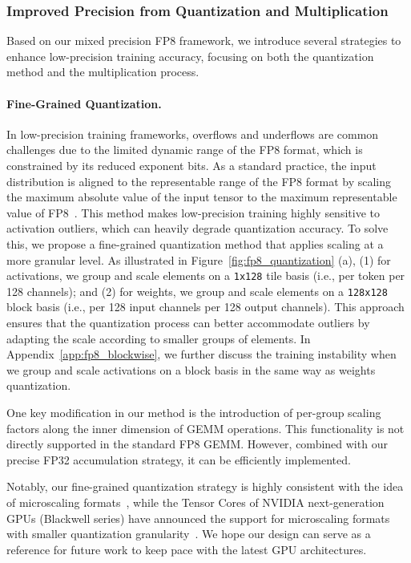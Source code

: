 \subsubsection{Improved Precision from Quantization and Multiplication}
Based on our mixed precision FP8 framework, we introduce several strategies to enhance low-precision training accuracy, focusing on both the quantization method and the multiplication process.

\paragraph{Fine-Grained Quantization.}
In low-precision training frameworks, overflows and underflows are common challenges due to the limited dynamic range of the FP8 format, which is constrained by its reduced exponent bits. 
As a standard practice, the input distribution is aligned to the representable range of the FP8 format by scaling the maximum absolute value of the input tensor to the maximum representable value of FP8~\citep{fp16train}. 
This method makes low-precision training highly sensitive to activation outliers, which can heavily degrade quantization accuracy.
To solve this, we propose a fine-grained quantization method that applies scaling at a more granular level. 
As illustrated in Figure~\ref{fig:fp8_quantization} (a), (1) for activations, we group and scale elements on a \texttt{1x128} tile basis (i.e., per token per 128 channels); and (2) for weights, we group and scale elements on a \texttt{128x128} block basis (i.e., per 128 input channels per 128 output channels).
This approach ensures that the quantization process can better accommodate outliers by adapting the scale according to smaller groups of elements. 
In Appendix~\ref{app:fp8_blockwise}, we further discuss the training instability when we group and scale activations on a block basis in the same way as weights quantization.

One key modification in our method is the introduction of per-group scaling factors along the inner dimension of GEMM operations. 
This functionality is not directly supported in the standard FP8 GEMM. 
However, combined with our precise FP32 accumulation strategy, it can be efficiently implemented. 

Notably, our fine-grained quantization strategy is highly consistent with the idea of microscaling formats~\citep{rouhani2023microscaling}, while the Tensor Cores of NVIDIA next-generation GPUs (Blackwell series) have announced the support for microscaling formats with smaller quantization granularity~\citep{nvidia_tensor_cores}. 
We hope our design can serve as a reference for future work to keep pace with the latest GPU architectures.

